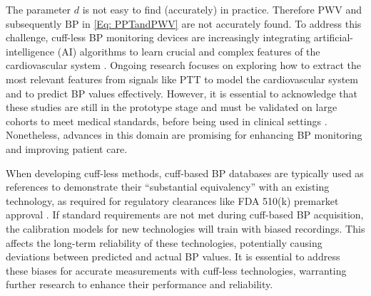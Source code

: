 \documentclass[journal,article,moreauthors]{Definitions/mdpi}
\begin{document}
The parameter $d$ is not easy to find (accurately) in practice. Therefore $\text{PWV}$ and subsequently $\text{BP}$ in \eqref{Eq: PPTandPWV} are not accurately found. To address this challenge, cuff-less BP monitoring devices are increasingly integrating artificial-intelligence (AI) algorithms to learn crucial and complex features of the cardiovascular system \citep{ding2016continuous, rastegar2020non}. Ongoing research focuses on exploring how to extract the most relevant features from signals like PTT to model the cardiovascular system and to predict BP values effectively. However, it is essential to acknowledge that these studies are still in the prototype stage and must be validated on large cohorts to meet medical standards, before being used in clinical settings \citep{rastegar2020non}. Nonetheless, advances in this domain are promising for enhancing BP monitoring and improving patient care.


When developing cuff-less methods, cuff-based BP databases are typically used as references to demonstrate their ``substantial equivalency'' with an existing technology, as required for regulatory clearances like FDA 510(k) premarket approval \citep{510k,alpert2014public, donawa2010continuing,alpert2017can}. If standard requirements are not met during cuff-based BP acquisition, the calibration models for new technologies will train with biased recordings. This affects the long-term reliability of these technologies, potentially causing deviations between predicted and actual BP values. It is essential to address these biases for accurate measurements with cuff-less technologies, warranting further research to enhance their performance and reliability.
\end{document}
